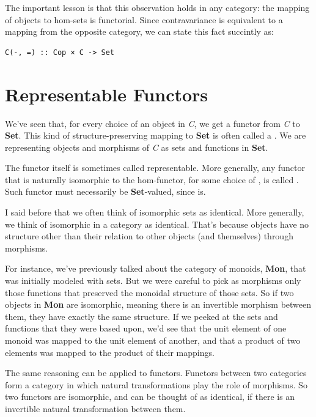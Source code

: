 The important lesson is that this observation holds in any category: the
mapping of objects to hom-sets is functorial. Since contravariance is
equivalent to a mapping from the opposite category, we can state this
fact succintly as:

\begin{Verbatim}[commandchars=\\\{\}]
C(-, =) :: Cop × C -> Set
\end{Verbatim}

\section{Representable Functors}\label{representable-functors}

We've seen that, for every choice of an object  in \emph{C},
we get a functor from \emph{C} to \textbf{Set}. This kind of
structure-preserving mapping to \textbf{Set} is often called a
. We are representing objects and morphisms of
\emph{C} as sets and functions in \textbf{Set}.

The functor  itself is sometimes called representable.
More generally, any functor  that is naturally isomorphic to
the hom-functor, for some choice of , is called
. Such functor must necessarily be
\textbf{Set}-valued, since  is.

I said before that we often think of isomorphic sets as identical. More
generally, we think of isomorphic  in a category as
identical. That's because objects have no structure other than their
relation to other objects (and themselves) through morphisms.

For instance, we've previously talked about the category of monoids,
\textbf{Mon}, that was initially modeled with sets. But we were careful
to pick as morphisms only those functions that preserved the monoidal
structure of those sets. So if two objects in \textbf{Mon} are
isomorphic, meaning there is an invertible morphism between them, they
have exactly the same structure. If we peeked at the sets and functions
that they were based upon, we'd see that the unit element of one monoid
was mapped to the unit element of another, and that a product of two
elements was mapped to the product of their mappings.

The same reasoning can be applied to functors. Functors between two
categories form a category in which natural transformations play the
role of morphisms. So two functors are isomorphic, and can be thought of
as identical, if there is an invertible natural transformation between
them.

